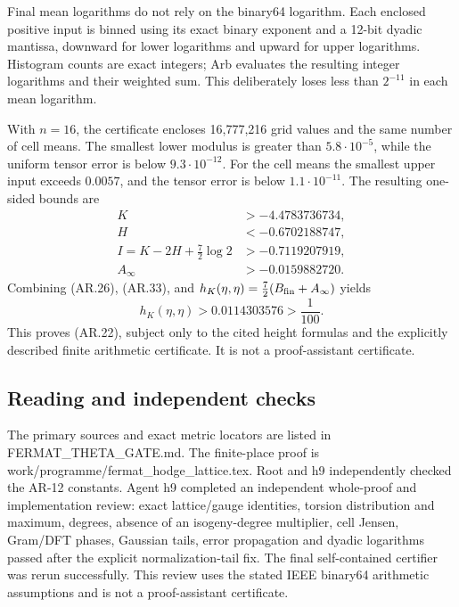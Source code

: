 Final mean logarithms do not rely on the binary64 logarithm. Each
enclosed positive input is binned using its exact binary exponent and a
12-bit dyadic mantissa, downward for lower logarithms and upward for
upper logarithms. Histogram counts are exact integers; Arb evaluates the
resulting integer logarithms and their weighted sum. This deliberately
loses less than \(2^{-11}\) in each mean logarithm.

With \(n=16\), the certificate encloses 16,777,216 grid values and the
same number of cell means. The smallest lower modulus is greater than
\(5.8\cdot10^{-5}\), while the uniform tensor error is below
\(9.3\cdot10^{-12}\). For the cell means the smallest upper input
exceeds \(0.0057\), and the tensor error is below \(1.1\cdot10^{-11}\).
The resulting one-sided bounds are \[
\begin{aligned}
K&>-4.4783736734,\\
H&<-0.6702188747,\\
I=K-2H+\tfrac72\log2&>-0.7119207919,\\
A_\infty&>-0.0159882720.
\end{aligned}
\tag{AR.33}
\] Combining (AR.26), (AR.33), and
\(h_K(\eta,\eta)=\frac72(B_{\rm fin}+A_\infty)\) yields \[
h_K(\eta,\eta)>0.0114303576>\frac1{100}.
\] This proves (AR.22), subject only to the cited height formulas and
the explicitly described finite arithmetic certificate. It is not a
proof-assistant certificate.

\subsection{Reading and independent
checks}\label{reading-and-independent-checks}

The primary sources and exact metric locators are listed in
FERMAT\_THETA\_GATE.md. The finite-place proof is
work/programme/fermat\_hodge\_lattice.tex. Root and h9 independently
checked the AR-12 constants. Agent h9 completed an independent
whole-proof and implementation review: exact lattice/gauge identities,
torsion distribution and maximum, degrees, absence of an isogeny-degree
multiplier, cell Jensen, Gram/DFT phases, Gaussian tails, error
propagation and dyadic logarithms passed after the explicit
normalization-tail fix. The final self-contained certifier was rerun
successfully. This review uses the stated IEEE binary64 arithmetic
assumptions and is not a proof-assistant certificate.
